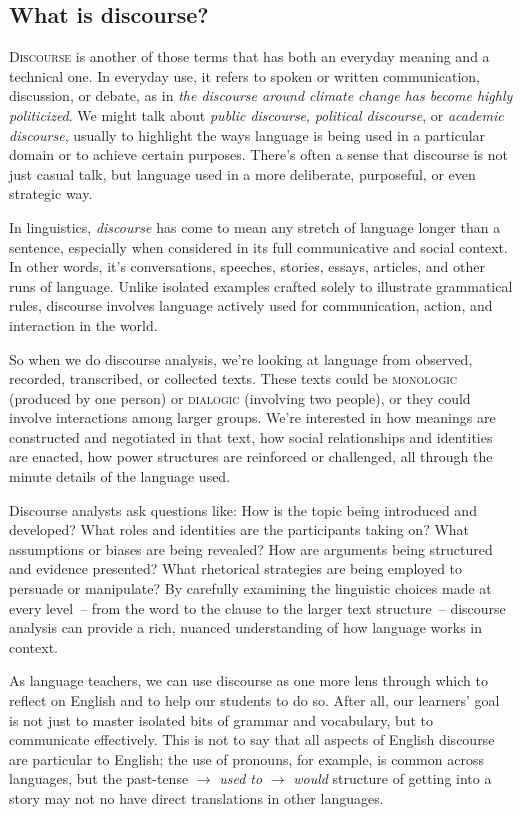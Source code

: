 \subsection{What is discourse?}

\textsc{Discourse} is another of those terms that has both an everyday meaning and a technical one. In everyday use, it refers to spoken or written communication, discussion, or debate, as in \textit{the discourse around climate change has become highly politicized}. We might talk about \textit{public discourse}, \textit{political discourse}, or \textit{academic discourse}, usually to highlight the ways language is being used in a particular domain or to achieve certain purposes. There's often a sense that discourse is not just casual talk, but language used in a more deliberate, purposeful, or even strategic way.

In linguistics, \textit{discourse} has come to mean any stretch of language longer than a sentence, especially when considered in its full communicative and social context. In other words, it's conversations, speeches, stories, essays, articles, and other runs of language. Unlike isolated examples crafted solely to illustrate grammatical rules, discourse involves language actively used for communication, action, and interaction in the world.

So when we do discourse analysis, we're looking at language from observed, recorded, transcribed, or collected texts. These texts could be \textsc{monologic} (produced by one person) or \textsc{dialogic} (involving two people), or they could involve interactions among larger groups. We're interested in how meanings are constructed and negotiated in that text, how social relationships and identities are enacted, how power structures are reinforced or challenged, all through the minute details of the language used.

Discourse analysts ask questions like: How is the topic being introduced and developed? What roles and identities are the participants taking on? What assumptions or biases are being revealed? How are arguments being structured and evidence presented? What rhetorical strategies are being employed to persuade or manipulate? By carefully examining the linguistic choices made at every level~-- from the word to the clause to the larger text structure~-- discourse analysis can provide a rich, nuanced understanding of how language works in context.

As language teachers, we can use discourse as one more lens through which to reflect on English and to help our students to do so. After all, our learners' goal is not just to master isolated bits of grammar and vocabulary, but to communicate effectively. This is not to say that all aspects of English discourse are particular to English; the use of pronouns, for example, is common across languages, but the past-tense $\rightarrow$ \textit{used to} $\rightarrow$ \textit{would} structure of getting into a story may not no have direct translations in other languages.

